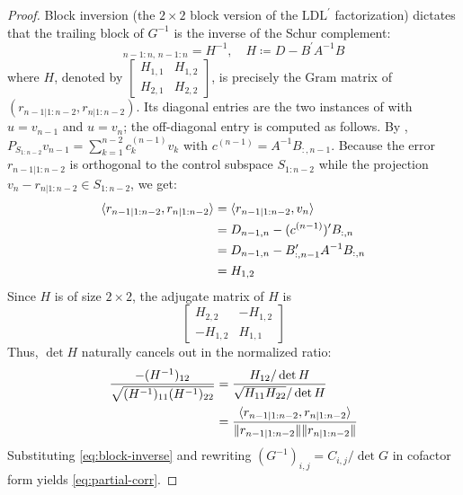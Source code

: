 \documentclass{IEEEtran}
\begin{document}
\begin{proof}
  Block inversion (the $2\times 2$ block version of the $\mathrm{LDL}^{\prime}$ factorization) dictates that the trailing block of $G^{-1}$ is the inverse of the Schur complement:
  \begin{equation}
    [G^{-1}]_{n-1:n,\,n-1:n} = H^{-1},
    \quad H \coloneq D - B^{\prime} A^{-1} B
    \label{eq:block-inverse}
  \end{equation}
  where $H$, denoted by $
  \begin{bmatrix}
    H_{1,1} & H_{1,2} \\
    H_{2,1} & H_{2,2}
  \end{bmatrix}$, is precisely the Gram matrix of $(r_{n-1|1:n-2}, r_{n|1:n-2})$. Its diagonal entries are the two instances of  with $u = v_{n-1}$ and $u = v_{n}$; the off-diagonal entry is computed as follows. By , $P_{S_{1:n-2}} v_{n-1} = \sum_{k=1}^{n-2} c^{(n-1)}_{k} v_{k}$ with $c^{(n-1)} = A^{-1} B_{:,n-1}$. Because the error $r_{n-1|1:n-2}$ is orthogonal to the control subspace $S_{1:n-2}$ while the projection $v_{n} - r_{n|1:n-2} \in S_{1:n-2}$, we get:
  \begin{equation*}
    \begin{aligned}
      \langle r_{n-1|1:n-2}, r_{n|1:n-2}\rangle
      &= \langle r_{n-1|1:n-2}, v_{n}\rangle \\
      &= D_{n-1,n} - (c^{(n-1)})^{\prime} B_{:,n} \\
      &= D_{n-1,n} - B_{:,n-1}^{\prime} A^{-1} B_{:,n} \\
      &= H_{1,2}
    \end{aligned}
  \end{equation*}
  Since $H$ is of size $2 \times 2$, the adjugate matrix of $H$ is
  \begin{equation*}
    \begin{bmatrix}
      H_{2,2} & -H_{1,2}\\
      -H_{1,2} & H_{1,1}
    \end{bmatrix}
  \end{equation*}
  Thus, $\det H$ naturally cancels out in the normalized ratio:
  \begin{align*}
    \frac{-(H^{-1})_{12}}{\sqrt{(H^{-1})_{11}(H^{-1})_{22}}}
    &= \frac{H_{12}/\det H}{\sqrt{H_{11}H_{22}}/\det H} \\
    &= \frac{\langle r_{n-1|1:n-2}, r_{n|1:n-2}\rangle}
    {\lVert r_{n-1|1:n-2}\rVert \lVert r_{n|1:n-2}\rVert}
  \end{align*}
  Substituting \eqref{eq:block-inverse} and rewriting $(G^{-1})_{i,j} = C_{i,j}/\det G$ in cofactor form yields \eqref{eq:partial-corr}.
\end{proof}
\end{document}
